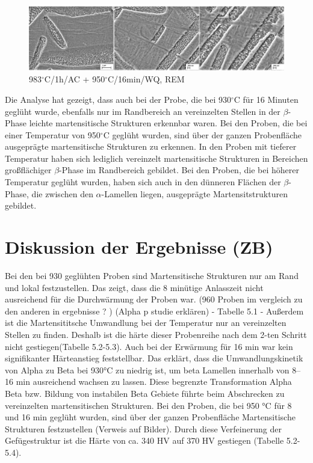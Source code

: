 \begin{figure}
	\centering
	\includegraphics[width=1.0\linewidth]{./Bilder/Abbildung 18}
	\caption[Abbildung 18]{983$^\circ$C/1h/AC + 950$^\circ$C/16min/WQ, REM}
	\label{fig:abbildung-18}
\end{figure}

Die Analyse hat gezeigt, dass auch bei der Probe, die bei 930$^\circ$C für 16 Minuten geglüht wurde, ebenfalls nur im Randbereich an vereinzelten Stellen in der $\beta$-Phase leichte martensitische Strukturen erkennbar waren.
Bei den Proben, die bei einer Temperatur von 950$^\circ$C geglüht wurden, sind über der ganzen Probenfläche ausgeprägte martensitische Strukturen zu erkennen. In den Proben mit tieferer Temperatur haben sich lediglich vereinzelt martensitische Strukturen in Bereichen großflächiger $\beta$-Phase im Randbereich gebildet. Bei den Proben, die bei höherer Temperatur geglüht wurden, haben sich auch in den dünneren Flächen der $\beta$-Phase, die zwischen den $\alpha$-Lamellen liegen, ausgeprägte Martensitstrukturen gebildet.


\section{Diskussion der Ergebnisse (ZB)}

Bei  den bei 930  geglühten Proben sind Martensitische Strukturen nur  am Rand und lokal festzustellen. Das zeigt, dass die 8 minütige Anlasszeit nicht ausreichend für die Durchwärmung der Proben war. (960 Proben im vergleich zu den anderen in ergebnisse ? )
(Alpha p studie erklären) - Tabelle 5.1 - 
Außerdem ist die Martensititsche Umwandlung bei der Temperatur  nur an vereinzelten  Stellen zu finden. Deshalb ist die härte dieser Probenreihe nach dem 2-ten Schritt nicht gestiegen(Tabelle 5.2-5.3). Auch bei der Erwärmung für 16 min war kein signifikanter Härteanstieg feststellbar. Das erklärt, dass die Umwandlungskinetik von Alpha zu Beta bei 930°C zu niedrig ist, um beta Lamellen  innerhalb von 8--16 min ausreichend  wachsen zu lassen. Diese begrenzte Transformation Alpha Beta bzw. Bildung von instabilen Beta Gebiete führte  beim Abschrecken zu vereinzelten martensitischen Strukturen.
Bei den Proben, die bei 950 °C für 8 und 16 min geglüht wurden, sind über der ganzen Probenfläche Martensitische Strukturen festzustellen (Verweis auf Bilder). Durch diese Verfeinerung der Gefügestruktur ist die Härte von ca. 340 HV auf 370 HV gestiegen (Tabelle 5.2-5.4). 

